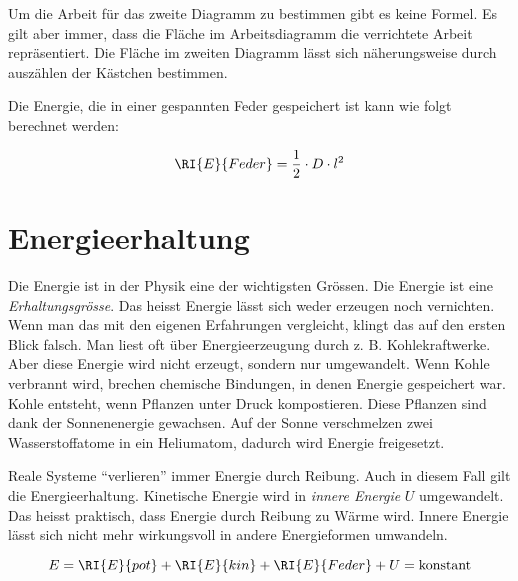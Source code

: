Um die Arbeit für das zweite Diagramm zu bestimmen gibt es keine Formel. Es gilt aber immer, dass die Fläche
im Arbeitsdiagramm die verrichtete Arbeit repräsentiert. Die Fläche im zweiten Diagramm lässt sich näherungsweise
durch auszählen der Kästchen bestimmen.

Die Energie, die in einer gespannten Feder gespeichert ist kann wie folgt berechnet werden:

\begin{cbox}
\begin{eqnarray*}
	\RI{E}{Feder}=\frac{1}{2}\cdot D\cdot l^2
\end{eqnarray*}
\end{cbox}

\newpage






\newpage

\section*{Energieerhaltung}
Die Energie ist in der Physik eine der wichtigsten Grössen. Die Energie ist eine \emph{Erhaltungsgrösse}.
Das heisst Energie lässt sich weder erzeugen noch vernichten.
Wenn man das mit den eigenen Erfahrungen vergleicht, klingt das auf den ersten Blick falsch.
Man liest oft über Energieerzeugung durch z. B. Kohlekraftwerke. Aber diese Energie wird nicht erzeugt,
sondern nur umgewandelt. Wenn Kohle verbrannt wird, brechen chemische Bindungen, in denen Energie gespeichert
war. Kohle entsteht, wenn Pflanzen unter Druck kompostieren. Diese Pflanzen sind dank der Sonnenenergie gewachsen.
Auf der Sonne verschmelzen zwei Wasserstoffatome in ein Heliumatom, dadurch wird Energie freigesetzt.


Reale Systeme ``verlieren'' immer Energie durch Reibung. Auch in diesem Fall gilt die Energieerhaltung.
Kinetische Energie wird in \emph{innere Energie} $U$ umgewandelt. Das heisst praktisch, dass Energie
durch Reibung zu Wärme wird. Innere Energie lässt sich nicht mehr
wirkungsvoll in andere Energieformen umwandeln.

\begin{cbox}
\begin{equation*}
	E = \RI{E}{pot} +\RI{E}{kin} + \RI{E}{Feder} + U = \text{konstant}
\end{equation*}
\end{cbox}

